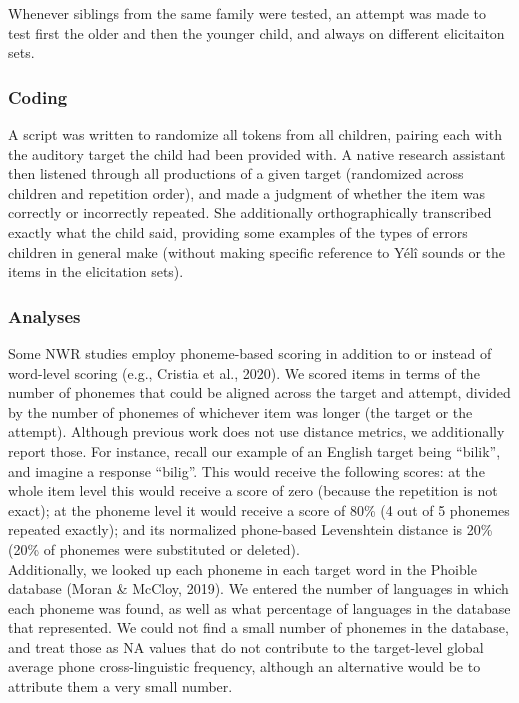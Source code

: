 \documentclass[english,,man,floatsintext]{apa6}
\begin{document}
Whenever siblings from the same family were tested, an attempt was made
to test first the older and then the younger child, and always on
different elicitaiton sets.

\subsubsection{Coding}\label{coding}

A script was written to randomize all tokens from all children, pairing
each with the auditory target the child had been provided with. A native
research assistant then listened through all productions of a given
target (randomized across children and repetition order), and made a
judgment of whether the item was correctly or incorrectly repeated. She
additionally orthographically transcribed exactly what the child said,
providing some examples of the types of errors children in general make
(without making specific reference to Yélî sounds or the items in the
elicitation sets).

\subsubsection{Analyses}\label{analyses}

Some NWR studies employ phoneme-based scoring in addition to or instead
of word-level scoring (e.g., Cristia et al., 2020). We scored items in
terms of the number of phonemes that could be aligned across the target
and attempt, divided by the number of phonemes of whichever item was
longer (the target or the attempt). Although previous work does not use
distance metrics, we additionally report those. For instance, recall our
example of an English target being ``bilik'', and imagine a response
``bilig''. This would receive the following scores: at the whole item
level this would receive a score of zero (because the repetition is not
exact); at the phoneme level it would receive a score of 80\% (4 out of
5 phonemes repeated exactly); and its normalized phone-based Levenshtein
distance is 20\% (20\% of phonemes were substituted or deleted).\\

Additionally, we looked up each phoneme in each target word in the
Phoible database (Moran \& McCloy, 2019). We entered the number of
languages in which each phoneme was found, as well as what percentage of
languages in the database that represented. We could not find a small
number of phonemes in the database, and treat those as NA values that do
not contribute to the target-level global average phone cross-linguistic
frequency, although an alternative would be to attribute them a very
small number.
\end{document}
